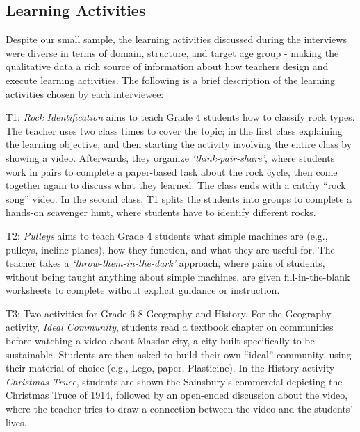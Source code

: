 \subsection{Learning Activities}
\label{sec:9}
Despite our small sample, the learning activities discussed during the interviews were diverse in terms of domain, structure, and target age group - making the qualitative data a rich source of information about how teachers design and execute learning activities. The following is a brief description of the learning activities chosen by each interviewee:



T1: \textit{Rock Identification} aims to teach Grade 4 students how to classify rock types. The teacher uses two class times to cover the topic; in the first class explaining the learning objective, and then starting the activity involving the entire class by showing a video. Afterwards, they organize {\it `think-pair-share'}, where students work in pairs to complete a paper-based task about the rock cycle, then come together again to discuss what they learned. The class ends with a catchy ``rock song'' video.  In the second class, T1 splits the students into groups to complete a hands-on scavenger hunt, where students have to identify different rocks.

T2: \textit{Pulleys} aims to teach Grade 4 students what simple machines are (e.g., pulleys, incline planes), how they function, and what they are useful for.  The teacher takes a {\it `throw-them-in-the-dark'} approach, where pairs of students, without being taught anything about simple machines, are given fill-in-the-blank worksheets to complete without explicit guidance or instruction.

T3: Two activities for Grade 6-8 Geography and History.  For the Geography activity, \textit{Ideal Community}, students read a textbook chapter on communities before watching a video about Masdar city, a city built specifically to be sustainable.  Students are then asked to build their own ``ideal'' community, using their material of choice (e.g., Lego, paper, Plasticine).  In the History activity \textit{Christmas Truce}, students are shown the Sainsbury's commercial depicting the Christmas Truce of 1914, followed by an open-ended discussion about the video, where the teacher tries to draw a connection between the video and the students' lives. 

